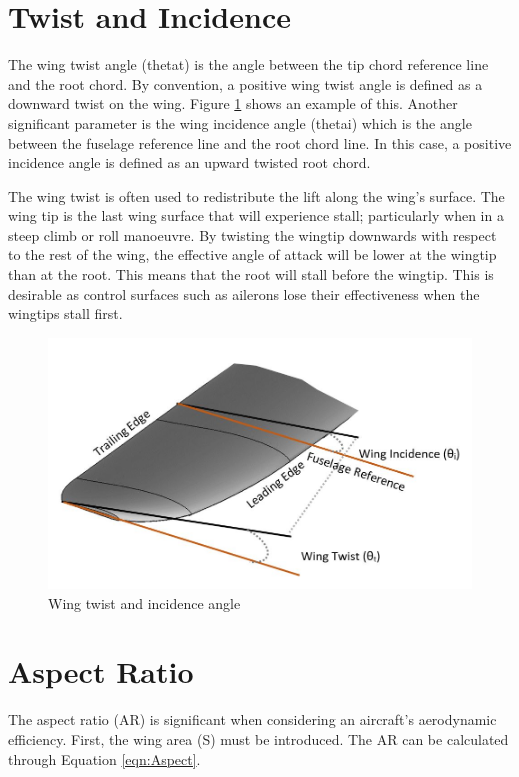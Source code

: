 \section{Twist and Incidence}
The wing twist angle (\acrshort{thetat}) is the angle between the tip chord reference line and the root chord. By convention, a positive wing twist angle is defined as a downward twist on the wing. Figure \ref{fig:twist} shows an example of this. Another significant parameter is the wing incidence angle (\acrshort{thetai}) which is the angle between the fuselage reference line and the root chord line. In this case, a positive incidence angle is defined as an upward twisted root chord. 

The wing twist is often used to redistribute the lift along the wing's surface. The wing tip is the last wing surface that will experience stall; particularly when in a steep climb or roll manoeuvre. By twisting the wingtip downwards with respect to the rest of the wing, the effective angle of attack will be lower at the wingtip than at the root. This means that the root will stall before the wingtip. This is desirable as control surfaces such as ailerons lose their effectiveness when the wingtips stall first. 


\begin{figure}[H]
  \centering
  \includegraphics[width=1\linewidth]{02_Background/Figs/wingo.JPG}
  \caption{Wing twist and incidence angle}
  \label{fig:twist}
\end{figure}

\section{Aspect Ratio}
The aspect ratio (\acrshort{AR}) is significant when considering an aircraft's aerodynamic efficiency. First, the wing area (\acrshort{S}) must be introduced. The AR can be calculated through Equation \ref{eqn:Aspect}.


